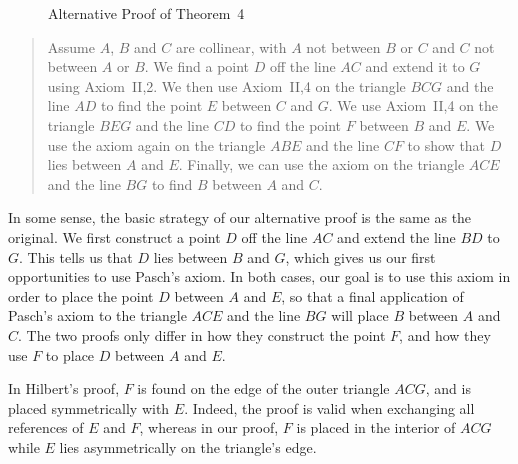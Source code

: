 \begin{figure}

    
\caption{Alternative Proof of Theorem~4}
\label{fig:Theorem4Alt}
\end{figure}

\begin{quote}
Assume $A$, $B$ and $C$ are collinear, with $A$ not between $B$ or $C$ and $C$ not between $A$ or $B$. We find a point $D$ off the line $AC$ and extend it to $G$ using Axiom~II,2. We then use Axiom~II,4 on the triangle $BCG$ and the line $AD$ to find the point $E$ between $C$ and $G$. We use Axiom~II,4 on the triangle $BEG$ and the line $CD$ to find the point $F$ between $B$ and $E$. We use the axiom again on the triangle $ABE$ and the line $CF$ to show that $D$ lies between $A$ and $E$. Finally, we can use the axiom on the triangle $ACE$ and the line $BG$ to find $B$ between $A$ and $C$.
\end{quote}

In some sense, the basic strategy of our alternative proof is the same as the original. We first construct a point $D$ off the line $AC$ and extend the line $BD$ to $G$. This tells us that $D$ lies between $B$ and $G$, which gives us our first opportunities to use Pasch's axiom. In both cases, our goal is to use this axiom in order to place the point $D$ between $A$ and $E$, so that a final application of Pasch's axiom to the triangle $ACE$ and the line $BG$ will place $B$ between $A$ and $C$. The two proofs only differ in how they construct the point $F$, and how they use $F$ to place $D$ between $A$ and $E$.

In Hilbert's proof, $F$ is found on the edge of the outer triangle $ACG$, and is placed symmetrically with $E$. Indeed, the proof is valid when exchanging all references of $E$ and $F$, whereas in our proof, $F$ is placed in the interior of $ACG$ while $E$ lies asymmetrically on the triangle's edge. 

